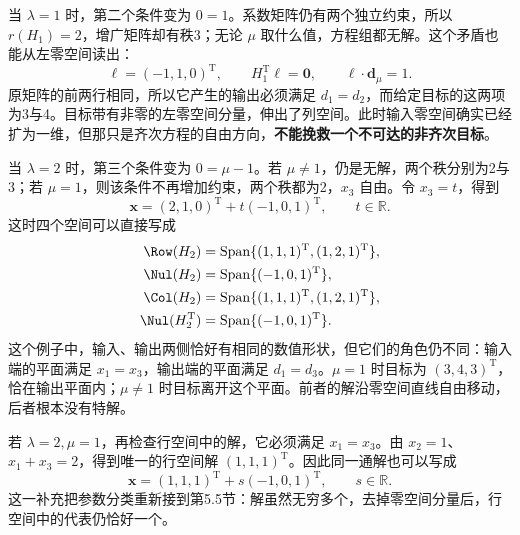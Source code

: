 \documentclass[a4paper,12pt,twoside,openany,fontset=none]{ctexbook}
\numberwithin{equation}{chapter}
\begin{document}
当 $\lambda=1$ 时，第二个条件变为 $0=1$。系数矩阵仍有两个独立约束，所以 $r(H_1)=2$，增广矩阵却有秩3；无论 $\mu$ 取什么值，方程组都无解。这个矛盾也能从左零空间读出：
\begin{equation}
 \boldsymbol\ell=(-1,1,0)^{\mathrm T},\qquad
 H_1^{\mathrm T}\boldsymbol\ell=\boldsymbol0,\qquad
 \boldsymbol\ell\cdot\boldsymbol d_\mu=1.
\end{equation}
原矩阵的前两行相同，所以它产生的输出必须满足 $d_1=d_2$，而给定目标的这两项为3与4。目标带有非零的左零空间分量，伸出了列空间。此时输入零空间确实已经扩为一维，但那只是齐次方程的自由方向，\textbf{不能挽救一个不可达的非齐次目标}。

当 $\lambda=2$ 时，第三个条件变为 $0=\mu-1$。若 $\mu\ne1$，仍是无解，两个秩分别为2与3；若 $\mu=1$，则该条件不再增加约束，两个秩都为2，$x_3$ 自由。令 $x_3=t$，得到
\begin{equation}
 \boldsymbol x=(2,1,0)^{\mathrm T}+t(-1,0,1)^{\mathrm T},
 \qquad t\in\mathbb R.
\end{equation}
这时四个空间可以直接写成
\begin{align}
 \Row(H_2)&=\operatorname{Span}\{(1,1,1)^{\mathrm T},(1,2,1)^{\mathrm T}\},\\
 \Nul(H_2)&=\operatorname{Span}\{(-1,0,1)^{\mathrm T}\},\\
 \Col(H_2)&=\operatorname{Span}\{(1,1,1)^{\mathrm T},(1,2,1)^{\mathrm T}\},\\
 \Nul(H_2^{\mathrm T})&=\operatorname{Span}\{(-1,0,1)^{\mathrm T}\}.
\end{align}
这个例子中，输入、输出两侧恰好有相同的数值形状，但它们的角色仍不同：输入端的平面满足 $x_1=x_3$，输出端的平面满足 $d_1=d_3$。$\mu=1$ 时目标为 $(3,4,3)^{\mathrm T}$，恰在输出平面内；$\mu\ne1$ 时目标离开这个平面。前者的解沿零空间直线自由移动，后者根本没有特解。

若 $\lambda=2,\mu=1$，再检查行空间中的解，它必须满足 $x_1=x_3$。由 $x_2=1$、$x_1+x_3=2$，得到唯一的行空间解 $(1,1,1)^{\mathrm T}$。因此同一通解也可以写成
\begin{equation}
 \boldsymbol x=(1,1,1)^{\mathrm T}+s(-1,0,1)^{\mathrm T},
 \qquad s\in\mathbb R.
\end{equation}
这一补充把参数分类重新接到第5.5节：解虽然无穷多个，去掉零空间分量后，行空间中的代表仍恰好一个。
\end{document}
